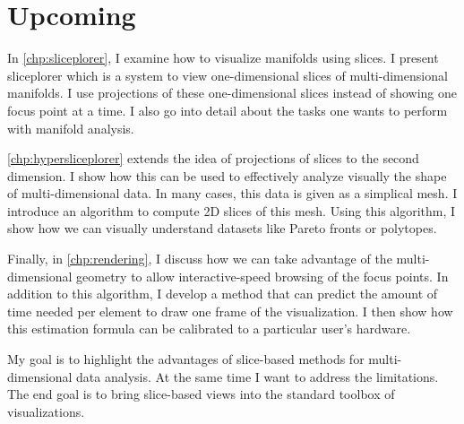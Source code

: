 
\section{Upcoming}
\label{sec:thesis_outline}

In \autoref{chp:sliceplorer}, I examine how to visualize manifolds using
slices. I present sliceplorer which is a system to view one-dimensional slices
of multi-dimensional manifolds. I use projections of these one-dimensional
slices instead of showing one focus point at a time. I also go into detail
about the tasks one wants to perform with manifold analysis.

\autoref{chp:hypersliceplorer} extends the idea of projections of slices to
the second dimension. I show how this can be used to effectively analyze
visually the shape of multi-dimensional data. In many cases, this data is given
as a simplical mesh. I introduce an algorithm to compute 2D slices of this mesh.
Using this algorithm, I show how we can visually understand datasets like
Pareto fronts or polytopes.

Finally, in \autoref{chp:rendering}, I discuss how we can take advantage of the
multi-dimensional geometry to allow interactive-speed browsing of the focus
points. In addition to this algorithm, I develop a method that can predict the
amount of time needed per element to draw one frame of the visualization. I
then show how this estimation formula can be calibrated to a particular user's
hardware.

My goal is to highlight the advantages of slice-based methods for
multi-dimensional data analysis. At the same time I want to address the
limitations. The end goal is to bring slice-based views into the standard
toolbox of visualizations.

